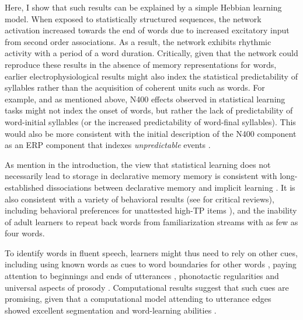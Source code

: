 \documentclass[
]{article}
\begin{document}
Here, I show that such results can be explained by a simple Hebbian
learning model. When exposed to statistically structured sequences, the
network activation increased towards the end of words due to increased
excitatory input from second order associations. As a result, the
network exhibits rhythmic activity with a period of a word duration.
Critically, given that the network could reproduce these results in the
absence of memory representations for words, earlier
electrophysiological results might also index the statistical
predictability of syllables rather than the acquisition of coherent
units such as words. For example, and as mentioned above, N400 effects
observed in statistical learning tasks
\citep{Abla2008, Cunillera2006, Kudo2011, Sanders2002, Teinonen2009}
might not index the onset of words, but rather the lack of
predictability of word-initial syllables (or the increased
predictability of word-final syllables). This would also be more
consistent with the initial description of the N400 component as an ERP
component that indexes \emph{unpredictable} events \citep{Kutas2000}.

As mention in the introduction, the view that statistical learning does
not necessarily lead to storage in declarative memory memory is
consistent with long-established dissociations between declarative
memory and implicit learning
\citetext{\citealp{Cohen1980}; \citealp{Finn2016}; \citealp[\citet{Knowlton1996a}]{Graf1984}; \citealp{Poldrack2001}; \citealp{Squire1992}}.
It is also consistent with a variety of behavioral results (see
\citep[\citet{Endress-stat-recall}]{Endress2020} for critical reviews),
including behavioral preferences for unattested high-TP items
\citep{Endress-Action-Axc, Endress-Phantoms-Vision, Endress-Phantoms, Jones2007, Turk-Browne-reversal}),
and the inability of adult learners to repeat back words from
familiarization streams with as few as four
words\citep{Endress-stat-recall}.

To identify words in fluent speech, learners might thus need to rely on
other cues, including using known words as cues to word boundaries for
other words \citep{Bortfeld2005, Brent2001, Mersad2012}, paying
attention to beginnings and ends of utterances
\citep{Monaghan2010, Seidl2008, Shukla2007}, phonotactic regularities
\citep{McQueen1998} and universal aspects of prosody
\citep{Brentari2011, Christophe2001, Endress-cross-seg, Pilon1981}.
Computational results suggest that such cues are promising, given that a
computational model attending to utterance edges showed excellent
segmentation and word-learning abilities \citep{Monaghan2010}.
\end{document}
